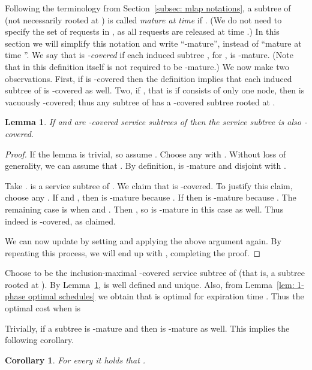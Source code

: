 \documentclass[a4paper]{article}
\newtheorem{lemma}[theorem]{Lemma}
\newtheorem{corollary}[theorem]{Corollary}
\begin{document}
Following the terminology from Section~\ref{subsec: mlap notations}, 
a subtree  of  (not necessarily rooted at )
is called \emph{mature at time } if . (We do not need to specify
the set of requests in , as all requests are released at time .)
In this section we will simplify this notation and write ``-mature'', instead of
``mature at time ''.
We say that  is \emph{-covered} if each induced subtree 
, for , is -mature. (Note that in this definition
 itself is not required to be -mature.)
We now make two observations. First, if  is -covered then
the definition implies that each induced subtree  of  is -covered as well.
Two, if , that is if  consists of only one node,
then  is vacuously -covered; thus any subtree 
of  has a -covered subtree rooted at . 


\begin{lemma}\label{lem: Ot unique}
If  and  are -covered service subtrees of  then
the service subtree  is also -covered.
\end{lemma}

\begin{proof}
If  the lemma is trivial, so assume .
Choose any  with .
Without loss of generality, we can assume that .
By definition,  is -mature and disjoint with . 

Take .  is a service subtree of . 
We claim that  is -covered. To justify this claim, choose any . 
If  and , then  is -mature because .
If  then  is -mature because .
The remaining case is when  and .
Then
,
so  is -mature in this case as well. 
Thus indeed  is -covered, as claimed.

We can now update  by setting  and applying the above argument again.
By repeating this process, we will end up with , completing the proof.
\end{proof}

Choose  to be the inclusion-maximal -covered service subtree of  (that is, 
a subtree rooted at ). By Lemma~\ref{lem: Ot unique},  is well defined and unique.
Also, from Lemma~\ref{lem: 1-phase optimal schedules} we obtain that  is optimal for 
expiration time . Thus the optimal cost when  is

Trivially, if a subtree  is -mature and  then  is -mature as well.
This implies the following corollary.


\begin{corollary}\label{cor:optima-grow}
For every  it holds that .
\end{corollary}
\end{document}
